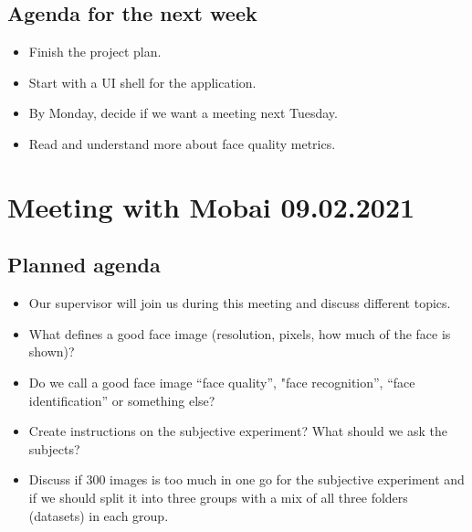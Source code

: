 \subsection*{Agenda for the next week}
\begin{itemize}
    \item Finish the project plan.
    \item Start with a UI shell for the application.
    \item By Monday, decide if we want a meeting next Tuesday.
    \item Read and understand more about face quality metrics.
\end{itemize}

\newpage

\section*{Meeting with Mobai 09.02.2021}
\subsection*{Planned agenda}
\begin{itemize}
    \item  Our supervisor will join us during this meeting and discuss different topics.
    \item What defines a good face image (resolution, pixels, how much of the face is shown)? 
    \item Do we call a good face image “face quality”, "face recognition”, “face identification” or something else? 
    \item Create instructions on the subjective experiment? What should we ask the subjects?
    \item Discuss if 300 images is too much in one go for the subjective experiment and if we should split it into three groups with a mix of all three folders (datasets) in each group.
\end{itemize}

